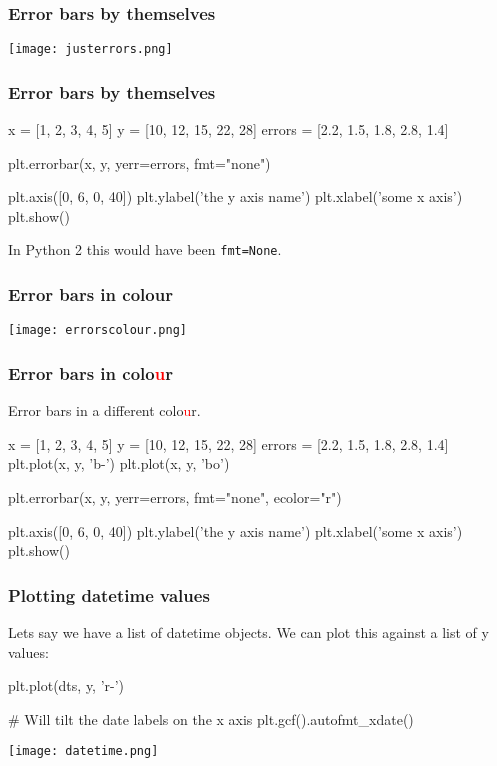 \documentclass{beamer}
\begin{document}
\begin{frame}[fragile]
\frametitle{Error bars by themselves}
\texttt{[image: justerrors.png]}
\end{frame}


\begin{frame}[fragile]
\frametitle{Error bars by themselves}

\begin{code}
x = [1, 2, 3, 4, 5]
y = [10, 12, 15, 22, 28]
errors = [2.2, 1.5, 1.8, 2.8, 1.4]

plt.errorbar(x, y, yerr=errors, fmt="none")

plt.axis([0, 6, 0, 40])
plt.ylabel('the y axis name')
plt.xlabel('some x axis')
plt.show()
\end{code}

In Python 2 this would have been \texttt{fmt=None}.
\end{frame}


\begin{frame}[fragile]
\frametitle{Error bars in colour}
\texttt{[image: errorscolour.png]}
\end{frame}

\begin{frame}[fragile]
\frametitle{Error bars in colo\textcolor{red}{u}r}

Error bars in a different colo\textcolor{red}{u}r.

\begin{code}
x = [1, 2, 3, 4, 5]
y = [10, 12, 15, 22, 28]
errors = [2.2, 1.5, 1.8, 2.8, 1.4]
plt.plot(x, y, 'b-')
plt.plot(x, y, 'bo')

plt.errorbar(x, y, yerr=errors, fmt="none", ecolor="r")

plt.axis([0, 6, 0, 40])
plt.ylabel('the y axis name')
plt.xlabel('some x axis')
plt.show()
\end{code}
\end{frame}


\begin{frame}[fragile]
\frametitle{Plotting datetime values}
Lets say we have a list of datetime objects. We can plot this against
a list of y values:
\begin{code}
plt.plot(dts, y, 'r-')

# Will tilt the date labels on the x axis
plt.gcf().autofmt_xdate()
\end{code}

\bigskip

\bigskip

\texttt{[image: datetime.png]}

\end{frame}
\end{document}
